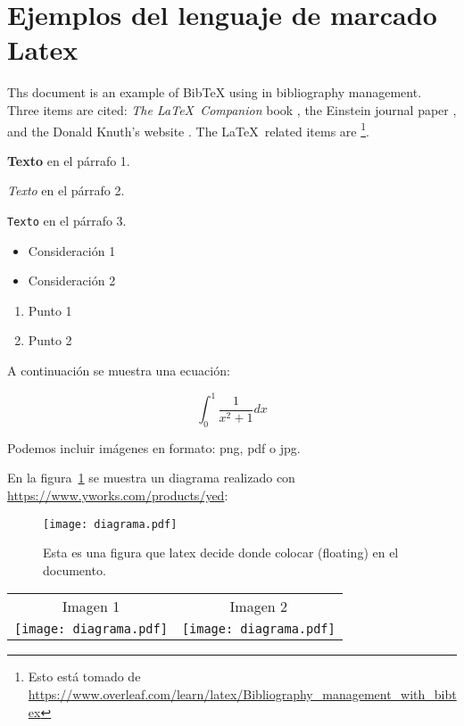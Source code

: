 \section{Ejemplos del lenguaje de marcado Latex}

Ths document is an example of BibTeX using in bibliography management. Three items 
are cited: \textit{The \LaTeX\ Companion} book \cite{latexcompanion}, the Einstein
journal paper \cite{einstein}, and the Donald Knuth's website \cite{knuthwebsite}. 
The \LaTeX\ related items are \cite{latexcompanion,knuthwebsite}\footnote{Esto está tomado de
\url{https://www.overleaf.com/learn/latex/Bibliography_management_with_bibtex}}.
 

  \textbf{Texto} en el párrafo 1.

  \textit{Texto} en el párrafo 2.

  \texttt{Texto} en el párrafo 3.


  \begin{itemize}
  \item Consideración 1
  \item Consideración 2
  \end{itemize}

  \vspace{0.5cm}
  
  \begin{enumerate}
  \item Punto 1
  \item Punto 2
  \end{enumerate}
  
A continuación se muestra una ecuación:

  \[ \int_{0}^{1}\frac{1}{x^2+1} dx \]

  Podemos incluir imágenes en formato: png, pdf o jpg.

  En la figura~\ref{fig:diagrama} se muestra un diagrama realizado con \href{yed}{https://www.yworks.com/products/yed}:

  \begin{figure}[!htb]
    \texttt{[image: diagrama.pdf]}
    \caption{Esta es una figura que latex decide donde colocar (floating) en el documento.}
    \label{fig:diagrama}
    \end{figure}

  \begin{tabular}{cc}
    Imagen 1 & Imagen 2 \\[2mm]
    \texttt{[image: diagrama.pdf]} &  \texttt{[image: diagrama.pdf]}
  \end{tabular}
  
